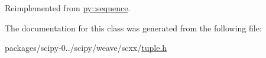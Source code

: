 Reimplemented from \hyperlink{classpy_1_1sequence_a6e059f2d64a97bf511fe656d789c1f21}{py\+::sequence}.



The documentation for this class was generated from the following file\+:\begin{DoxyCompactItemize}
\item 
packages/scipy-\/0../scipy/weave/scxx/\hyperlink{tuple_8h}{tuple.\+h}\end{DoxyCompactItemize}
